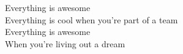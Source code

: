 
Everything is awesome\\
Everything is cool when you're part of a team\\
Everything is awesome\\
When you're living out a dream\\

